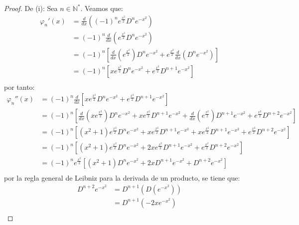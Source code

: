 \documentclass[12pt]{report}
\theoremstyle{largebreak}
\begin{document}
    \begin{proof}
        De (i): Sea $n\in\mathbb{N}^*$. Veamos que:
        \begin{equation*}
            \begin{split}
                \varphi_n'(x)
                &=\frac{d}{dx}\left((-1)^ne^{\frac{x^2}{2}}D^ne^{-x^2} \right)\\
                &=(-1)^n\frac{d}{dx}\left(e^{\frac{x^2}{2}}D^n e^{-x^2}\right)\\
                &=(-1)^n\left[\frac{d}{dx}\left(e^{\frac{x^2}{2}}\right)D^n e^{-x^2}+e^{\frac{x^2}{2}}\frac{d}{dx}\left(D^n e^{-x^2}\right)\right] \\
                &=(-1)^n\left[xe^{\frac{x^2}{2}}D^n e^{-x^2}+e^{\frac{x^2}{2}}D^{n+1 } e^{-x^2}\right] \\
            \end{split}
        \end{equation*}
        por tanto:
        \begin{equation*}
            \begin{split}
                \varphi_n''(x)
                &=(-1)^n\frac{d}{dx}\left[xe^{\frac{x^2}{2}}D^n e^{-x^2}+e^{\frac{x^2}{2}}D^{n+1 } e^{-x^2}\right] \\
                &=(-1)^n\left[\frac{d}{dx}(xe^{\frac{x^2}{2}})D^n e^{-x^2}+xe^{\frac{x^2}{2}}D^{n+1}e^{-x^2}+\frac{d}{dx}(e^{\frac{x^2}{2}})D^{n+1 } e^{-x^2}+e^{\frac{x^2}{2}}D^{n+2 } e^{-x^2}\right] \\
                &=(-1)^n\left[(x^2+1)e^{\frac{x^2}{2}}D^n e^{-x^2}+xe^{\frac{x^2}{2}}D^{n+1}e^{-x^2}+xe^{\frac{x^2}{2}}D^{n+1 } e^{-x^2}+e^{\frac{x^2}{2}}D^{n+2 } e^{-x^2}\right] \\
                &=(-1)^n\left[(x^2+1)e^{\frac{x^2}{2}}D^n e^{-x^2}+2xe^{\frac{x^2}{2}}D^{n+1}e^{-x^2}+e^{\frac{x^2}{2}}D^{n+2 } e^{-x^2}\right] \\
                &=(-1)^ne^{\frac{x^2}{2}}\left[(x^2+1)D^n e^{-x^2}+2xD^{n+1}e^{-x^2}+D^{n+2 } e^{-x^2}\right] \\
            \end{split}
        \end{equation*}
        por la regla general de Leibniz para la derivada de un producto, se tiene que:
        \begin{equation*}
            \begin{split}
                D^{n+2}e^{-x^2}&=D^{n+1}(D(e^{-x^2})) \\
                &=D^{n+1}(-2xe^{-x^2}) \\

\end{split}
\end{equation*}
\end{proof}
\end{document}
